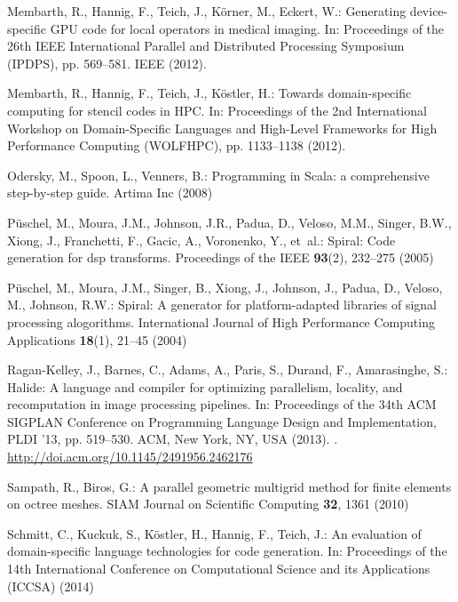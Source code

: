 \documentclass[onecolumn]{svjour3}
\begin{document}
\begin{thebibliography}{10}
{Membarth}, R., {Hannig}, F., {Teich}, J., {K{\"o}rner}, M., {Eckert}, W.:
  Generating device-specific {GPU} code for local operators in medical imaging.
\newblock In: Proceedings of the 26th IEEE International Parallel and
  Distributed Processing Symposium (IPDPS), pp. 569--581. IEEE (2012).
\newblock {}

{Membarth}, R., {Hannig}, F., {Teich}, J., {K{\"o}stler}, H.: Towards
  domain-specific computing for stencil codes in {HPC}.
\newblock In: Proceedings of the 2nd International Workshop on Domain-Specific
  Languages and High-Level Frameworks for High Performance Computing (WOLFHPC),
  pp. 1133--1138 (2012).
\newblock {}

Odersky, M., Spoon, L., Venners, B.: Programming in Scala: a comprehensive
  step-by-step guide.
\newblock Artima Inc (2008)

P{\"u}schel, M., Moura, J.M., Johnson, J.R., Padua, D., Veloso, M.M., Singer,
  B.W., Xiong, J., Franchetti, F., Gacic, A., Voronenko, Y., et~al.: Spiral:
  Code generation for dsp transforms.
\newblock Proceedings of the IEEE \textbf{93}(2), 232--275 (2005)

P{\"u}schel, M., Moura, J.M., Singer, B., Xiong, J., Johnson, J., Padua, D.,
  Veloso, M., Johnson, R.W.: Spiral: A generator for platform-adapted libraries
  of signal processing alogorithms.
\newblock International Journal of High Performance Computing Applications
  \textbf{18}(1), 21--45 (2004)

Ragan-Kelley, J., Barnes, C., Adams, A., Paris, S., Durand, F., Amarasinghe,
  S.: Halide: A language and compiler for optimizing parallelism, locality, and
  recomputation in image processing pipelines.
\newblock In: Proceedings of the 34th ACM SIGPLAN Conference on Programming
  Language Design and Implementation, PLDI '13, pp. 519--530. ACM, New York,
  NY, USA (2013).
\newblock {}.
\newblock \urlprefix\url{http://doi.acm.org/10.1145/2491956.2462176}

Sampath, R., Biros, G.: A parallel geometric multigrid method for finite
  elements on octree meshes.
\newblock SIAM Journal on Scientific Computing \textbf{32}, 1361 (2010)

{Schmitt}, C., {Kuckuk}, S., {K{\"o}stler}, H., {Hannig}, F., {Teich}, J.: An
  evaluation of domain-specific language technologies for code generation.
\newblock In: Proceedings of the 14th International Conference on Computational
  Science and its Applications (ICCSA) (2014)


\end{thebibliography}
\end{document}

